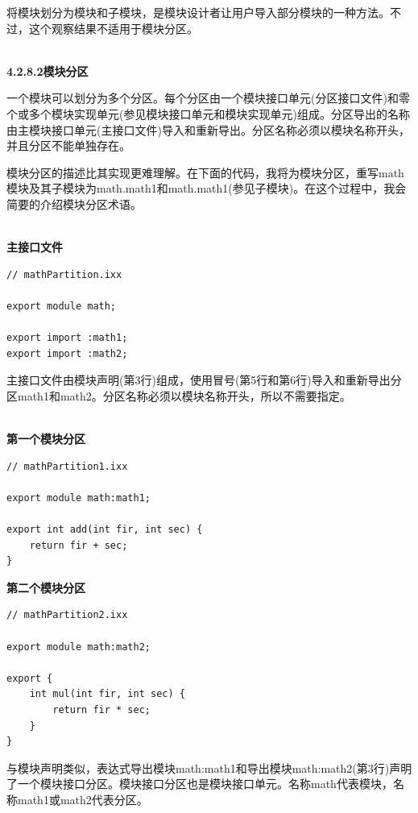 将模块划分为模块和子模块，是模块设计者让用户导入部分模块的一种方法。不过，这个观察结果不适用于模块分区。

\hspace*{\fill} \\ %
\noindent
\textbf{4.2.8.2\hspace{0.2cm}模块分区}

一个模块可以划分为多个分区。每个分区由一个模块接口单元(分区接口文件)和零个或多个模块实现单元(参见模块接口单元和模块实现单元)组成。分区导出的名称由主模块接口单元(主接口文件)导入和重新导出。分区名称必须以模块名称开头，并且分区不能单独存在。

模块分区的描述比其实现更难理解。在下面的代码，我将为模块分区，重写math模块及其子模块为math.math1和math.math1(参见子模块)。在这个过程中，我会简要的介绍模块分区术语。

\hspace*{\fill} \\ %
\noindent
\textbf{主接口文件}
\begin{lstlisting}[style=styleCXX]
// mathPartition.ixx

export module math;

export import :math1;
export import :math2;
\end{lstlisting}

主接口文件由模块声明(第3行)组成，使用冒号(第5行和第6行)导入和重新导出分区math1和math2。分区名称必须以模块名称开头，所以不需要指定。

\hspace*{\fill} \\ %
\noindent
\textbf{第一个模块分区}
\begin{lstlisting}[style=styleCXX]
// mathPartition1.ixx

export module math:math1;

export int add(int fir, int sec) {
	return fir + sec;
}
\end{lstlisting}

\noindent
\textbf{第二个模块分区}
\begin{lstlisting}[style=styleCXX]
// mathPartition2.ixx

export module math:math2;

export {
	int mul(int fir, int sec) {
		return fir * sec;
	}
}
\end{lstlisting}

与模块声明类似，表达式导出模块math:math1和导出模块math:math2(第3行)声明了一个模块接口分区。模块接口分区也是模块接口单元。名称math代表模块，名称math1或math2代表分区。

